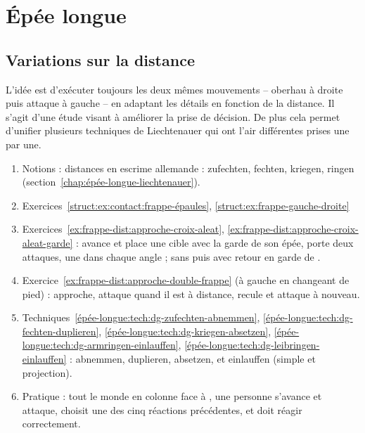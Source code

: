 \section{Épée longue}


\subsection{Variations sur la distance}



L'idée est d'exécuter toujours les deux mêmes mouvements – oberhau à droite puis attaque à gauche – en adaptant les détails en fonction de la distance.
Il s'agit d'une étude visant à améliorer la prise de décision.
De plus cela permet d'unifier plusieurs techniques de Liechtenauer qui ont l'air différentes prises une par une.


\begin{enumerate}
	\item Notions : distances en escrime allemande : zufechten, fechten, kriegen, ringen (section~\ref{chap:épée-longue-liechtenauer}).
	
	\item Exercices~\ref{struct:ex:contact:frappe-épaules}, \ref{struct:ex:frappe-gauche-droite}
	
	\item Exercices~\ref{ex:frappe-dist:approche-croix-aleat}, \ref{ex:frappe-dist:approche-croix-aleat-garde} : \D avance et place une cible avec la garde de son épée, \A porte deux attaques, une dans chaque angle ; sans puis avec retour en garde de \A.
	
	\item Exercice~\ref{ex:frappe-dist:approche-double-frappe} (à gauche en changeant de pied) : \D approche, \A attaque quand il est à distance, \D recule et \A attaque à nouveau.
	
	\item Techniques~\ref{épée-longue:tech:dg-zufechten-abnemmen}, \ref{épée-longue:tech:dg-fechten-duplieren}, \ref{épée-longue:tech:dg-kriegen-absetzen}, \ref{épée-longue:tech:dg-armringen-einlauffen}, \ref{épée-longue:tech:dg-leibringen-einlauffen} : abnemmen, duplieren, absetzen, et einlauffen (simple et projection).
	
	\item Pratique : tout le monde en colonne face à \D, une personne \A s'avance et attaque, \D choisit une des cinq réactions précédentes, et \A doit réagir correctement.
\end{enumerate}

